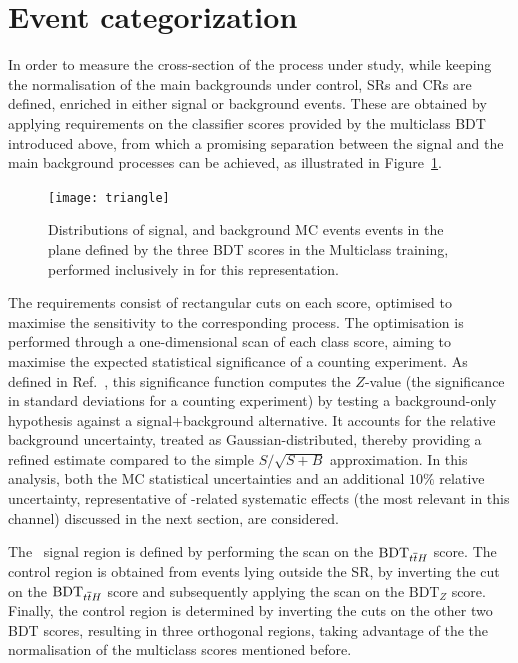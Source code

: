 \section{Event categorization}
\label{sec:tth_categories}

In order to measure the cross-section of the process under study, while keeping the normalisation of the main backgrounds under control, SRs and CRs are defined, enriched in either signal or background events. These are obtained by applying requirements on the classifier scores provided by the multiclass BDT introduced above, from which a promising separation between the signal and the main background processes can be achieved, as illustrated in Figure~\ref{fig:triangle}.

\begin{figure}[htbp]
  \centering
  \texttt{[image: triangle]}
  \caption{Distributions of signal, \ztautau and \ttbar background MC events events in the plane defined by the three BDT scores in the Multiclass training, performed inclusively in \pth for this representation.}
  \label{fig:triangle}
\end{figure}

The requirements consist of rectangular cuts on each score, optimised to maximise the sensitivity to the corresponding process. The optimisation is performed through a one-dimensional scan of each class score, aiming to maximise the expected statistical significance of a counting experiment. As defined in Ref.~\cite{ATL-PHYS-PUB-2020-025}, this significance function computes the $Z$-value (the significance in standard deviations for a counting experiment) by testing a background-only hypothesis against a signal+background alternative. It accounts for the relative background uncertainty, treated as Gaussian-distributed, thereby providing a refined estimate compared to the simple $S/\sqrt{S+B}$ approximation. In this analysis, both the MC statistical uncertainties and an additional $10\%$ relative uncertainty, representative of \ttbar-related systematic effects (the most relevant in this channel) discussed in the next section, are considered.

The \ttH\ signal region is defined by performing the scan on the $\text{BDT}_{\text{\ensuremath{t\overline{t}H}}}$ score. The \ztautau control region is obtained from events lying outside the \ttH SR, by inverting the cut on the $\text{BDT}_{\text{\ensuremath{t\overline{t}H}}}$ score and subsequently applying the scan on the $\text{BDT}_{Z}$ score. Finally, the \ttbar control region is determined by inverting the cuts on the other two BDT scores, resulting in three orthogonal regions, taking advantage of the the normalisation of the multiclass scores mentioned before.

